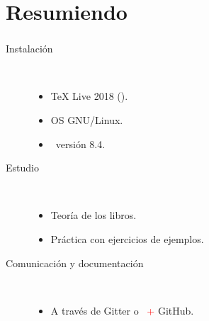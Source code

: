 \section{Resumiendo}
\begin{frame}[c]\frametitle{\insertsection}
\begin{description}
\item[Instalación] \hfill\\
\begin{itemize}
	\item \TeX{} Live 2018 (\arara).
	\item OS GNU/Linux.
	\item \sage\ versión 8.4.
\end{itemize}

\item[Estudio]\hfill\\
\begin{itemize}
	\item Teoría de los libros.
	\item Práctica con ejercicios de ejemplos.
\end{itemize}

\item[Comunicación y documentación]\hfill\\
\begin{itemize}
	\item A través de Gitter o \hangouts\ \textcolor{red}{+} GitHub.
\end{itemize}
\end{description}

\end{frame}